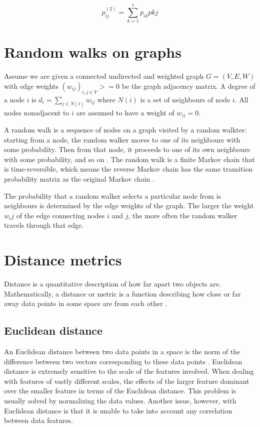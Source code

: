 \begin{displaymath}
p_{ij}^{(2)} = \sum_{k=1}^{r} p_{ik}p{kj}
\end{displaymath}

\section{Random walks on graphs}
\label{sec:randomWalks}

Assume we are given a connected undirected and weighted graph $G = (V,E,W)$ with
edge weights $(w_{ij})_{i,j \in V} >= 0$ be the graph adjacency matrix. A degree
of a node $i$ is $d_{i} = \sum_{j \in N(i)} w_{ij}$ where $N(i)$ is a set of 
neighbours of node $i$. All nodes nonadjacent to $i$ are assumed to have a 
weight of $w_{ij} = 0$.

A random walk is a sequence of nodes on a graph visited by a random walkter: 
starting from a node, the random walker moves to one of its neighbours with some
probability. Then from that node, it proceeds to one of its own neighbours with 
some probability, and so on \cite{Khoa:2012}. The random walk is a finite Markov
chain that is time-reversible, which means the reverse Markov chain has the same
transition probability matrix as the original Markov chain \cite{Lovasz:1996}.

The probability that a random walker selects a particular node from is 
neighbours is determined by the edge weights of the graph. The larger the weight
${w_ij}$ of the edge connecting nodes $i$ and $j$, the more often the random 
walker travels through that edge.

\section{Distance metrics}
\label{sec:distanceMetrics}
Distance is a quantitative description of how far apart two objects are. 
Mathematically, a distance or metric is a function describing how close or far 
away data points in some space are from each other \cite{Khoa:2012}.

\subsection{Euclidean distance}
\label{sec:euclideanDistance}
An Euclidean distance between two data points in a space is the norm of the 
difference between two vectors corresponding to these data points 
\cite{Khoa:2012}. Euclidean distance is extremely sensitive to the scale of the 
features involved. When dealing with features of vastly different scales, the 
effects of the larger feature dominant over the smaller feature in terms of the 
Euclidean distance. This problem is usually solved by normalizing the data 
values. Another issue, however, with Euclidean distance is that it is unable to 
take into account any correlation between data features.

